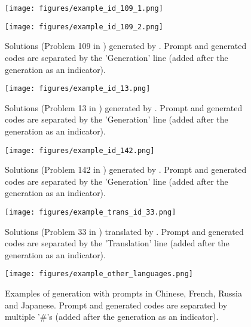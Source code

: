 \begin{figure}[htbp]
    \centering
    \begin{minipage}[t]{\textwidth}
    \texttt{[image: figures/example\_id\_109\_1.png]}
    \end{minipage}
    \begin{minipage}[t]{\textwidth}
    \texttt{[image: figures/example\_id\_109\_2.png]}
    \end{minipage}
    \caption{Solutions (Problem 109 in \bench) generated by \name. Prompt and generated codes are separated by the 'Generation' line (added after the generation as an indicator).}
    \label{fig:hx_example_id_109}
\end{figure}

\begin{figure}[htbp]
    \centering
    \texttt{[image: figures/example\_id\_13.png]}
    \caption{Solutions (Problem 13 in \bench) generated by \name. Prompt and generated codes are separated by the 'Generation' line (added after the generation as an indicator).}
    \label{fig:hx_example_id_13}
    \vspace{-5mm}
\end{figure}

\begin{figure}[htbp]
    \centering
    \texttt{[image: figures/example\_id\_142.png]}
    \caption{Solutions (Problem 142 in \bench) generated by \name. Prompt and generated codes are separated by the 'Generation' line (added after the generation as an indicator).}
    \label{fig:hx_example_id_142}
    \vspace{-5mm}
\end{figure}

\begin{figure}[htbp]
    \centering
    \texttt{[image: figures/example\_trans\_id\_33.png]}
    \caption{Solutions (Problem 33 in \bench) translated by \name. Prompt and generated codes are separated by the 'Translation' line (added after the generation as an indicator).}
    \label{fig:hx_example_trans_id_33}
    \vspace{-5mm}
\end{figure}

\begin{figure}[htbp]
    \centering
    \texttt{[image: figures/example\_other\_languages.png]}
    \caption{Examples of \name generation with prompts in Chinese, French, Russia and Japanese. Prompt and generated codes are separated by multiple '\#'s (added after the generation as an indicator).}
    \label{fig:example_other_languages}
    \vspace{-5mm}
\end{figure}

%
